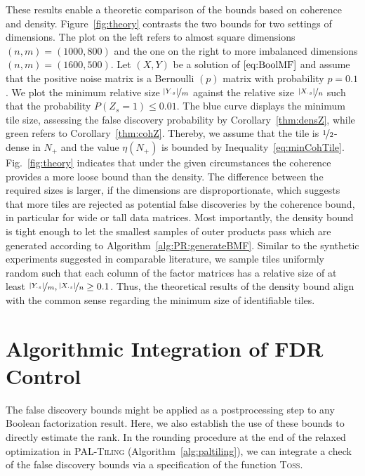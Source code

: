 These results enable a theoretic comparison of the bounds based on coherence and density. Figure~\ref{fig:theory} contrasts the two bounds for two settings of dimensions. The plot on the left refers to almost square dimensions $(n,m)=(1000,800)$ and the one on the right to more imbalanced dimensions $(n,m)=(1600,500)$. Let $(X,Y)$ be a solution of $\eqref{eq:BoolMF}$ and assume that the positive noise matrix is a Bernoulli $(p)$ matrix with probability $p=0.1$. We plot the minimum relative size $\nicefrac{|Y_{\cdot s}|}{m}$ against the relative size $\nicefrac{|X_{\cdot s}|}{n}$ such that the probability $P(Z_s=1)\leq 0.01$. The blue curve displays the minimum tile size, assessing the false discovery probability by Corollary~\ref{thm:densZ}, while green refers to Corollary~\ref{thm:cohZ}. Thereby, we assume that the tile is $\nicefrac{1}{2}$-dense in $N_+$ and the value $\eta(N_+)$ is bounded by Inequality~\eqref{eq:minCohTile}. Fig.~\ref{fig:theory} indicates that under the given circumstances the coherence provides a more loose bound than the density. The difference between the required sizes is larger, if the dimensions are disproportionate, which suggests that more tiles are rejected as potential false discoveries by the coherence bound, in particular for wide or tall data matrices. Most importantly, the density bound is tight enough to let the smallest samples of outer products pass which are generated according to Algorithm~\ref{alg:PR:generateBMF}. Similar to the synthetic experiments suggested in comparable literature, we sample tiles uniformly random such that each column of the factor matrices has a relative size of at least $\nicefrac{|Y_{\cdot s}|}{m},\nicefrac{|X_{\cdot s}|}{n}\geq 0.1$. Thus, the theoretical results of the density bound align with the common sense regarding the minimum size of identifiable tiles.   
\section{Algorithmic Integration of FDR Control}\label{sec:TP:algorithmicIntegration}
The false discovery bounds might be applied as a postprocessing step to any Boolean factorization result. Here, we also establish the use of these bounds to directly estimate the rank.
In the rounding procedure at the end of the relaxed optimization in \textsc{PAL-Tiling} (Algorithm~\ref{alg:paltiling}), we can integrate a check of the false discovery bounds via a specification of the function \textsc{Toss}.
 
